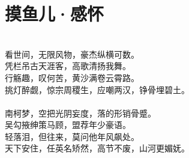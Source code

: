 \chapter{摸鱼儿·感怀}

\leftskip=15mm
\noindent \\
看世间，无限风物，豪杰纵横可数。\\
凭栏吊古天涯客，高歌清扬我舞。\\
行觞趣，叹何苦，黄沙满卷云霄路。\\
挑灯醉觑，惊宗周稷生，应嘲两汉，铮骨埋碧土。\\
\\
南柯梦，空把光阴妄度，落的形销骨蹙。\\
吴勾掖绅策马顾，盟荐年少豪语。\\
轻落泪，但往来，莫问他年风飙处。\\
天下安住，任英名矫然，高节不废，山河更媚妩。
